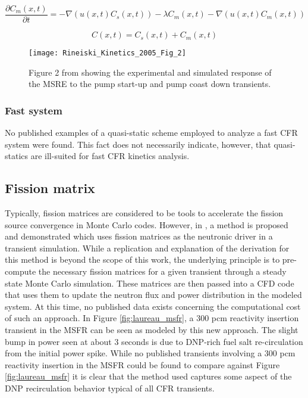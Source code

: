 \documentclass[review]{elsarticle}
\begin{document}
\begin{equation}
    \label{eq:spk_move}
    \frac{\partial C_{m}(x,t)}{\partial t} = - \nabla (u(x,t) C_{s}(x,t)) -
        \lambda C_{m}(x,t) - \nabla(u(x,t) C_{m}(x,t))
\end{equation}

\begin{equation}
    \label{eq:spk_uni}
    C(x,t) = C_{s}(x,t) + C_{m}(x,t)
\end{equation}

\begin{figure}[H]
   \centering
   \texttt{[image: Rineiski\_Kinetics\_2005\_Fig\_2]}
   \caption{Figure 2 from \cite{rineiski_kinetics_2005} showing the experimental and simulated
   response of the MSRE to the pump start-up and pump coast down transients.} 
   \label{fig:rineiski_msre_ps}
\end{figure}

\subsubsection{Fast system} \label{sssec:qs_fast}
No published examples of a quasi-static scheme employed to analyze a fast
CFR system were found. This fact  does not necessarily indicate, however, that
quasi-statics are ill-suited for fast CFR kinetics analysis.

\subsection{Fission matrix}
Typically, fission matrices are considered to be tools to accelerate the fission
source convergence in Monte Carlo codes. However, in 
\cite{laureau_coupled_2015}, a method is proposed and demonstrated which uses
fission matrices as the neutronic driver in a transient simulation. While a
replication and explanation of the derivation for this method is beyond the
scope of this work, the underlying principle is to pre-compute the necessary
fission matrices for a given transient through a steady state Monte Carlo
simulation. These matrices are then passed into a CFD code that uses them
to update the neutron flux and power distribution in the modeled system. At
this time, no published data exists concerning the computational cost
of such an approach. In Figure \ref{fig:laureau_msfr}, a 300 pcm reactivity
insertion transient in the MSFR can be seen as modeled by this new approach. The
slight bump in power seen at about 3 seconds is due to DNP-rich fuel salt
re-circulation from the initial power spike. While no published transients
involving a 300 pcm reactivity insertion in the MSFR could be found to compare
against Figure \ref{fig:laureau_msfr} it is clear that the method used
captures some aspect of the DNP recirculation behavior typical of all CFR
transients.
\end{document}
